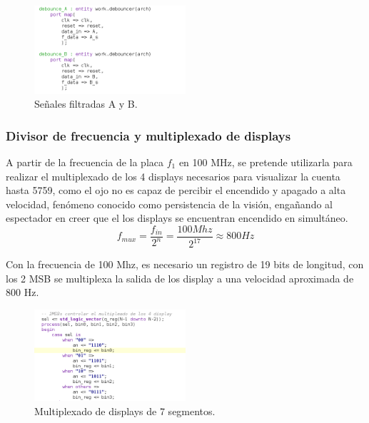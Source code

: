 \documentclass[11pt, a4paper]{article}
\begin{document}
	\begin{figure}[H]
		\centering
		\includegraphics[width=0.5\textwidth]{Imagenes/A_B.png}
		\caption{Señales filtradas A y B.}
		\label{fig:A_B}
	\end{figure} 


	\subsubsection{Divisor de frecuencia y multiplexado de displays}
			A partir de la frecuencia de la placa $f_1$ en 100 MHz, se pretende utilizarla para realizar el multiplexado de los 4 displays necesarios para visualizar la cuenta hasta 5759, como el ojo no es capaz de percibir el encendido y apagado a alta velocidad, fenómeno conocido como persistencia de la visión, engañando al espectador en creer que el los displays se encuentran encendido en simultáneo.
		\begin{equation}
			f_{mux} = \frac{f_{in}}{2^n} = \frac{100Mhz}{2^{17}} \approx 800 Hz
		\end{equation}

			Con la frecuencia de 100 Mhz, es necesario un registro de 19 bits de longitud, con los 2 MSB se multiplexa la salida de los display a una velocidad aproximada de 800 Hz.
		\begin{figure}[H]
			\centering
			\includegraphics[width=0.5\textwidth]{Imagenes/mux.png}
			\caption{Multiplexado de displays de 7 segmentos.}
			\label{fig:mux}
		\end{figure} 
		
		
\end{document}

